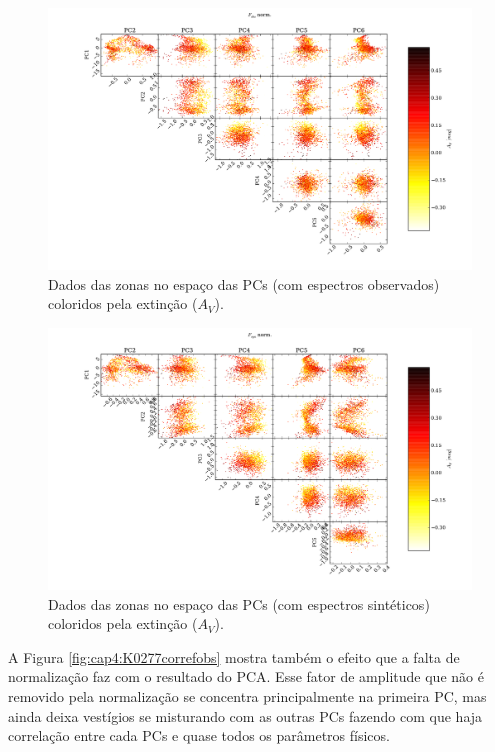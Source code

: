\begin{figure}
	\includegraphics[width=1.4\textwidth, angle=-90]{figuras/K0277-f_obs_norm-corre_PCxPC_AV.pdf}
	\caption[Dados no espaço das PCs vs AV- $F_{obs}$ norm.]
    {Dados das zonas no espaço das PCs (com espectros observados) coloridos pela extinção ($A_V$).}
    \label{fig:cap4:K0277correfobsnormPCvsPC:AV}	
\end{figure}

\begin{figure}
	\includegraphics[width=1.4\textwidth, angle=-90]{figuras/K0277-f_syn_norm-corre_PCxPC_AV.pdf}
	\caption[Dados no espaço das PCs vs AV- $F_{syn}$ norm.]
    {Dados das zonas no espaço das PCs (com espectros sintéticos) coloridos pela extinção ($A_V$).}
    \label{fig:cap4:K0277correfsynnormPCvsPC:AV}	
\end{figure}

A Figura \ref{fig:cap4:K0277correfobs} mostra também o efeito que a falta de normalização faz com o resultado do PCA.
Esse fator de amplitude que não é removido pela normalização se concentra principalmente na primeira PC, mas ainda
deixa vestígios se misturando com as outras PCs fazendo com que haja correlação entre cada PCs e quase todos os
parâmetros físicos.

